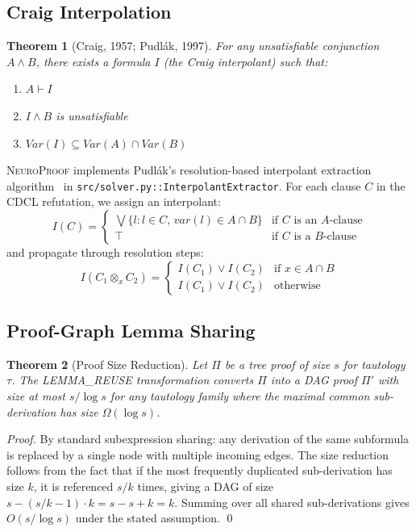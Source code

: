 \documentclass[conference]{IEEEtran}
\newtheorem{theorem}{Theorem}[section]
\newcommand{\proves}{\vdash}
\newcommand{\dlor}{\mathbin{\vee}}
\newcommand{\dltop}{\top}
\newcommand{\NP}{\textsc{NeuroProof}}
\begin{document}
\subsection{Craig Interpolation}

\begin{theorem}[Craig, 1957; Pudlák, 1997]
  For any unsatisfiable conjunction $A \wedge B$, there exists a formula $I$
  (the \emph{Craig interpolant}) such that:
  \begin{enumerate}
    \item[(i)]   $A \proves I$
    \item[(ii)]  $I \wedge B$ is unsatisfiable
    \item[(iii)] $\mathit{Var}(I) \subseteq \mathit{Var}(A) \cap \mathit{Var}(B)$
  \end{enumerate}
\end{theorem}

\NP{} implements Pudlák's resolution-based interpolant extraction
algorithm~\cite{Krajicek1995} in \texttt{src/solver.py::InterpolantExtractor}.
For each clause $C$ in the CDCL refutation, we assign an interpolant:
\begin{equation}
  I(C) = \begin{cases}
    \bigvee\{l : l \in C,\, \mathit{var}(l) \in A \cap B\}
      & \text{if } C \text{ is an $A$-clause} \\
    \dltop & \text{if } C \text{ is a $B$-clause}
  \end{cases}
\end{equation}
and propagate through resolution steps:
\begin{equation}
  I(C_1 \otimes_x C_2) = \begin{cases}
    I(C_1) \dlor I(C_2) & \text{if } x \in A \cap B \\
    I(C_1) \dlor I(C_2) & \text{otherwise}
  \end{cases}
\end{equation}

\subsection{Proof-Graph Lemma Sharing}

\begin{theorem}[Proof Size Reduction]
  \label{thm:proof-size}
  Let $\Pi$ be a tree proof of size $s$ for tautology $\tau$.  The
  \textup{LEMMA\_REUSE} transformation converts $\Pi$ into a DAG proof $\Pi'$
  with size at most $s / \log s$ for any tautology family where the maximal
  common sub-derivation has size $\Omega(\log s)$.
\end{theorem}
\begin{proof}
  By standard subexpression sharing: any derivation of the same subformula is
  replaced by a single node with multiple incoming edges.  The size reduction
  follows from the fact that if the most frequently duplicated sub-derivation
  has size $k$, it is referenced $s/k$ times, giving a DAG of size
  $s - (s/k - 1) \cdot k = s - s + k = k$.  Summing over all shared
  sub-derivations gives $O(s / \log s)$ under the stated assumption.
  \qed
\end{proof}
\end{document}
